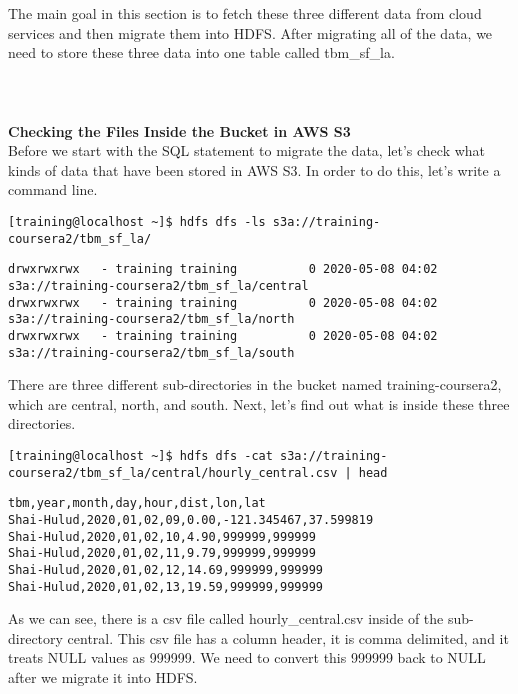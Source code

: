 \documentclass[a4paper,
							12pt,
							oneside,
							openright,
							DIV10,
							numbers=noendperiod
							]{scrreprt} %
\begin{document}
\noindent
The main goal in this section is to fetch these three different data from cloud services and then migrate them into HDFS. After migrating all of the data, we need to store these three data into one table called tbm\_sf\_la.\\
\\
\\
\\

\noindent
\textbf{Checking the Files Inside the Bucket in AWS S3}\\

\noindent
Before we start with the SQL statement to migrate the data, let's check what kinds of data that have been stored in AWS S3. In order to do this, let's write a command line.\\

\begin{lstlisting}
[training@localhost ~]$ hdfs dfs -ls s3a://training-coursera2/tbm_sf_la/
\end{lstlisting}

\begin{lstlisting}
drwxrwxrwx   - training training          0 2020-05-08 04:02 s3a://training-coursera2/tbm_sf_la/central
drwxrwxrwx   - training training          0 2020-05-08 04:02 s3a://training-coursera2/tbm_sf_la/north
drwxrwxrwx   - training training          0 2020-05-08 04:02 s3a://training-coursera2/tbm_sf_la/south
\end{lstlisting}

\noindent
There are three different sub-directories in the bucket named training-coursera2, which are central, north, and south. Next, let's find out what is inside these three directories.

\begin{lstlisting}
[training@localhost ~]$ hdfs dfs -cat s3a://training-coursera2/tbm_sf_la/central/hourly_central.csv | head
\end{lstlisting}

\begin{lstlisting}
tbm,year,month,day,hour,dist,lon,lat
Shai-Hulud,2020,01,02,09,0.00,-121.345467,37.599819
Shai-Hulud,2020,01,02,10,4.90,999999,999999
Shai-Hulud,2020,01,02,11,9.79,999999,999999
Shai-Hulud,2020,01,02,12,14.69,999999,999999
Shai-Hulud,2020,01,02,13,19.59,999999,999999
\end{lstlisting}

\noindent
As we can see, there is a csv file called hourly\_central.csv inside of the sub-directory central. This csv file has a column header, it is comma delimited, and it treats NULL values as 999999. We need to convert this 999999 back to NULL after we migrate it into HDFS.\\
\end{document}
